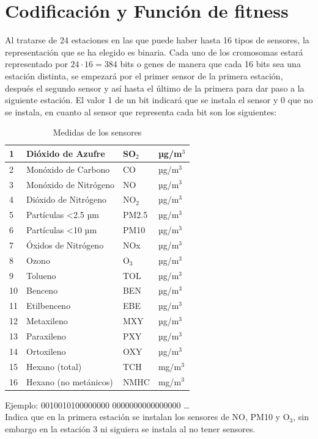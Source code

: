 \documentclass[12pt, spanish, pdftex]{UC3M_document}
\begin{document}
\section{Codificación y Función de fitness}
Al tratarse de 24 estaciones en las que puede haber hasta 16 tipos de sensores, la representación que se ha elegido es binaria. Cada uno de los cromosomas estará representado por $24 \cdot 16=384$ bits o genes de manera que cada 16 bits sea una estación distinta, se empezará por el primer sensor de la primera estación, después el segundo sensor y así hasta el último de la primera para dar paso a la siguiente estación. El valor 1 de un bit indicará que se instala el sensor y 0 que no se instala, en cuanto al sensor que representa cada bit son los siguientes:
\begin{table}[H]
	\centering
	\caption{Medidas de los sensores}
	\begin{tabular}{|l|l|l|l|}
		\hline
		1  & Dióxido de Azufre           & SO$_2$ & µg/m$^3$ \\ \hline
		2  & Monóxido de Carbono         & CO     & µg/m$^3$ \\ \hline
		3  & Monóxido de Nitrógeno       & NO     & µg/m$^3$ \\ \hline
		4  & Dióxido de Nitrógeno        & NO$_2$ & µg/m$^3$ \\ \hline
		5  & Partículas \textless 2.5 µm & PM2.5  & µg/m$^3$ \\ \hline
		6  & Partículas \textless 10 µm  & PM10   & µg/m$^3$ \\ \hline
		7  & Óxidos de Nitrógeno         & NOx    & µg/m$^3$ \\ \hline
		8  & Ozono                       & O$_3$  & µg/m$^3$ \\ \hline
		9  & Tolueno                     & TOL    & µg/m$^3$ \\ \hline
		10 & Benceno                     & BEN    & µg/m$^3$ \\ \hline
		11 & Etilbenceno                 & EBE    & µg/m$^3$ \\ \hline
		12 & Metaxileno                  & MXY    & µg/m$^3$ \\ \hline
		13 & Paraxileno                  & PXY    & µg/m$^3$ \\ \hline
		14 & Ortoxileno                  & OXY    & µg/m$^3$ \\ \hline
		15 & Hexano (total)              & TCH    & mg/m$^3$ \\ \hline
		16 & Hexano (no metánicos)       & NMHC   & mg/m$^3$ \\ \hline
	\end{tabular}
\end{table}
Ejemplo: 0010010100000000 0000000000000000 … \\ Indica que en la primera estación se instalan los sensores de NO, PM10 y O$_3$, sin embargo en la estación 3 ni siguiera se instala al no tener sensores.
\pagebreak
\end{document}
